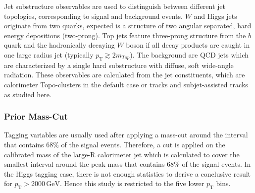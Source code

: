 
Jet substructure observables are used to distinguish between different jet topologies, corresponding to signal and background events. $W$ and Higgs jets originate from two quarks, expected is a structure of two angular separated, hard energy depositions (two-prong). Top jets feature three-prong structure from the $b$ quark and the hadronically decaying $W$ boson if all decay products are caught in one large radius jet (typically $p_{\text{T}}\gtrsim 2m_{Top}$). The background are QCD jets which are characterized by a single hard substructure with diffuse, soft wide-angle radiation. These observables are calculated from the jet constituents, which are calorimeter Topo-clusters in the default case or tracks and subjet-assisted tracks as studied here.

\subsubsection{Prior Mass-Cut}
Tagging variables are usually used after applying a mass-cut around the interval that contains 68\% of the signal events. Therefore, a cut is applied on the calibrated mass of the large-R calorimeter jet which is calculated to cover the smallest interval around the peak mass that contains 68\% of the signal events. In the Higgs tagging case, there is not enough statistics to derive a conclusive result for $p_{\mathrm{T}} > 2000 \, \text{GeV}$. Hence this study is restricted to the five lower $p_{\mathrm{T}}$ bins.

